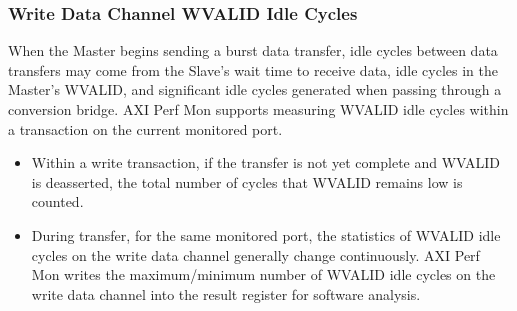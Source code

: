 \documentclass[main\_\_EN.tex]{subfiles}
\begin{document}
\subsubsection{Write Data Channel WVALID Idle Cycles}
When the Master begins sending a burst data transfer, idle cycles between data transfers may come from the Slave's wait time to receive data, idle cycles in the Master's WVALID, and significant idle cycles generated when passing through a conversion bridge. AXI Perf Mon supports measuring WVALID idle cycles within a transaction on the current monitored port.
\begin{itemize}
    \item Within a write transaction, if the transfer is not yet complete and WVALID is deasserted, the total number of cycles that WVALID remains low is counted. 
    \item During transfer, for the same monitored port, the statistics of WVALID idle cycles on the write data channel generally change continuously. AXI Perf Mon writes the maximum/minimum number of WVALID idle cycles on the write data channel into the result register for software analysis.
\end{itemize}
\end{document}
